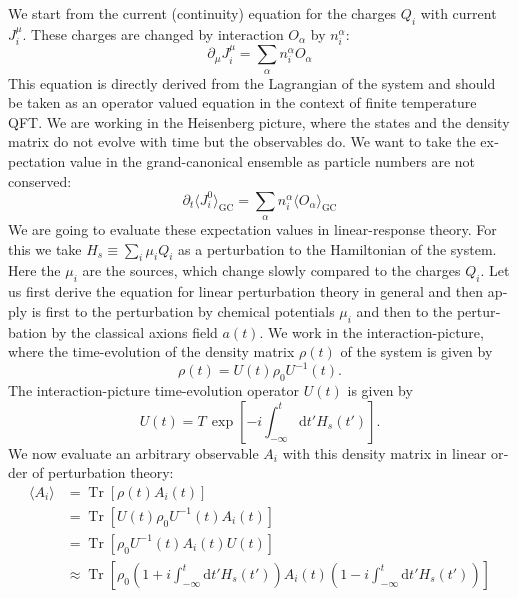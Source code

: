 \documentclass[master,       %
               twoside,        %
               BCOR10mm,       %
               english,ngerman, %
               ]{GAUBM}
\begin{document}
\begin{otherlanguage}{english}
We start from the current (continuity) equation for the charges $Q_i$ with current $J_i^\mu$. These charges are changed by interaction $O_\alpha$ by $n_i^\alpha$:
\begin{equation}
	\label{eq:current_eq}
	\partial_\mu J_i^\mu = \sum_\alpha n_i^\alpha O_\alpha
\end{equation}
This equation is directly derived from the Lagrangian of the system and should be taken as an operator valued equation in the context of finite temperature QFT. We are working in the Heisenberg picture, where the states and the density matrix do not evolve with time but the observables do.
We want to take the expectation value in the grand-canonical ensemble as particle numbers are not conserved:
\begin{equation}
	\label{eq:current_eq_expectation_value}
	\partial_t \langle J_i^0 \rangle_{\mathrm{GC}} = \sum_\alpha n_i^\alpha \langle O_\alpha \rangle_{\mathrm{GC}}
\end{equation}
We are going to evaluate these expectation values in linear-response theory.
For this we take $H_s \equiv \sum_i \mu_i Q_i$ as a perturbation to the Hamiltonian of the system.
Here the $\mu_i$ are the sources, which change slowly compared to the charges $Q_i$.
Let us first derive the equation for linear perturbation theory in general and then apply is first to the perturbation by chemical potentials $\mu_i$ and then to the perturbation by the classical axions field $a(t)$.
We work in the interaction-picture, where the time-evolution of the density matrix $\rho(t)$ of the system is given by
\begin{equation}
    \rho(t) = U(t) \rho_0 U^{-1}(t).
\end{equation}
The interaction-picture time-evolution operator $U(t)$ is given by
\begin{equation}
    U(t) = T \, \exp \left[ - i \int_{-\infty}^t  \mathrm{d} t' H_s(t') \right].
\end{equation}
We now evaluate an arbitrary observable $A_i$ with this density matrix in linear order of perturbation theory:
\begin{align}
	\label{eq:linear_response}
    \langle A_i \rangle &= \operatorname{Tr} \left[ \rho(t) A_i(t) \right] \nonumber \\
    &= \operatorname{Tr} \left[ U(t) \rho_0 U^{-1}(t) A_i(t) \right] \nonumber \\
    &= \operatorname{Tr} \left[ \rho_0 U^{-1}(t) A_i(t) U(t) \right] \nonumber \\
    &\approx \operatorname{Tr} \left[ \rho_0 (1 + i \int_{-\infty}^t \mathrm{d} t' H_s(t')) A_i(t) (1 - i \int_{-\infty}^t \mathrm{d} t' H_s(t')) \right] \nonumber \\

\end{align}
\end{otherlanguage}
\end{document}
